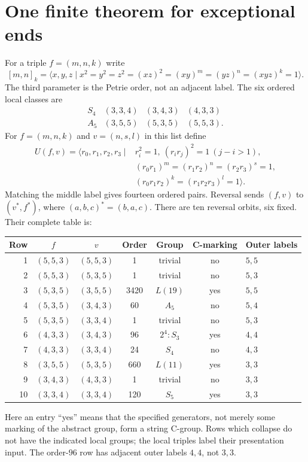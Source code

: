 \section{One finite theorem for exceptional ends}
For a triple $f=(m,n,k)$ write
\begin{equation}\label{eq:local}
 [m,n]_k=\langle x,y,z\mid x^2=y^2=z^2=(xz)^2=
 (xy)^m=(yz)^n=(xyz)^k=1\rangle.
\end{equation}
The third parameter is the Petrie order, not an adjacent label.
The six ordered local classes are
\begin{equation}\label{eq:localtypes}
\begin{array}{c|ccc}
 S_4&(3,3,4)&(3,4,3)&(4,3,3)\\
 A_5&(3,5,5)&(5,3,5)&(5,5,3).
\end{array}
\end{equation}
For $f=(m,n,k)$ and $v=(n,s,l)$ in this list define
\begin{equation}\label{eq:universal}
\begin{split}
 U(f,v)=\langle r_0,r_1,r_2,r_3\mid{}
 &r_i^2=1,\ (r_ir_j)^2=1\ (j-i>1),\\
 &(r_0r_1)^m=(r_1r_2)^n=(r_2r_3)^s=1,\\
 &(r_0r_1r_2)^k=(r_1r_2r_3)^l=1\rangle.
\end{split}
\end{equation}
Matching the middle label gives fourteen ordered pairs. Reversal sends
$(f,v)$ to $(v^*,f^*)$, where $(a,b,c)^*=(b,a,c)$.
There are ten reversal orbits, six fixed. Their complete table is:
\begin{center}\small
\begin{tabular}{rcccccl}
\toprule
Row&$f$&$v$&Order&Group&C-marking&Outer labels\\
\midrule
1&$(5,5,3)$&$(5,5,3)$&1&trivial&no&$5,5$\\
2&$(5,5,3)$&$(5,3,5)$&1&trivial&no&$5,3$\\
3&$(5,3,5)$&$(3,5,5)$&3420&$L(19)$&yes&$5,5$\\
4&$(5,3,5)$&$(3,4,3)$&60&$A_5$&no&$5,4$\\
5&$(5,3,5)$&$(3,3,4)$&1&trivial&no&$5,3$\\
6&$(4,3,3)$&$(3,4,3)$&96&$2^4:S_3$&yes&$4,4$\\
7&$(4,3,3)$&$(3,3,4)$&24&$S_4$&no&$4,3$\\
8&$(3,5,5)$&$(5,3,5)$&660&$L(11)$&yes&$3,3$\\
9&$(3,4,3)$&$(4,3,3)$&1&trivial&no&$3,3$\\
10&$(3,3,4)$&$(3,3,4)$&120&$S_5$&yes&$3,3$\\
\bottomrule
\end{tabular}
\end{center}
Here an entry ``yes'' means that the specified generators, not merely some
marking of the abstract group, form a string C-group. Rows which collapse
do not have the indicated local groups; the local triples label their
presentation input. The order-$96$ row has adjacent outer labels $4,4$,
not $3,3$.

